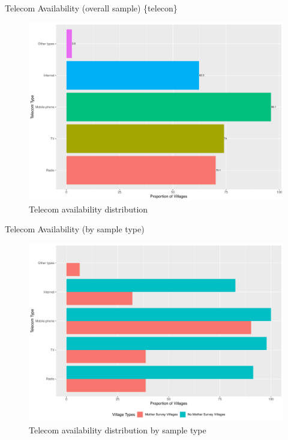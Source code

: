 \documentclass[
  ignorenonframetext,
]{beamer}
\begin{document}
\begin{frame}{Telecom Availability (overall sample) \{telecon\}}
\protect\hypertarget{telecom-availability-overall-sample-telecon}{}
\begin{figure}
\includegraphics[width=1\linewidth]{example_plots_files/figure-beamer/unnamed-chunk-17-1} \caption{Telecom availability distribution}\label{fig:unnamed-chunk-17}
\end{figure}
\end{frame}

\begin{frame}{Telecom Availability (by sample type)}
\protect\hypertarget{telecom-availability-by-sample-type}{}
\begin{figure}
\includegraphics[width=1\linewidth]{example_plots_files/figure-beamer/unnamed-chunk-18-1} \caption{Telecom availability distribution by sample type}\label{fig:unnamed-chunk-18}
\end{figure}
\end{frame}
\end{document}
